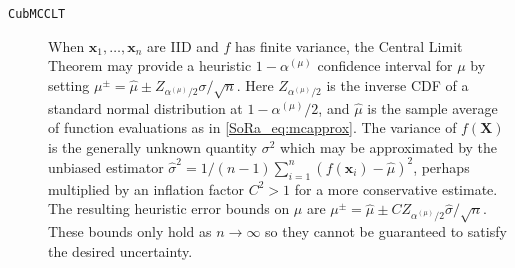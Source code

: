\documentclass[graybox]{svmult}
\begin{document}
\begin{description}
    \item[\texttt{CubMCCLT}] When $\boldsymbol{x}_1,\dots,\boldsymbol{x}_n$ are IID and $f$ has finite variance, the Central Limit Theorem may provide a heuristic $1-\alpha^{(\mu)}$ confidence interval for $\mu$ by setting $\mu^\pm = \hat{\mu} \pm Z_{\alpha^{(\mu)}/2}\sigma/\sqrt{n}$. Here $Z_{\alpha^{(\mu)}/2}$ is the inverse CDF of a standard normal distribution at $1-\alpha^{(\mu)}/2$, and $\hat{\mu}$ is the sample average of function evaluations as in \eqref{SoRa_eq:mcapprox}. The variance of $f(\boldsymbol{X})$ is the generally unknown quantity $\sigma^2$ which may be approximated by the unbiased estimator $\hat{\sigma}^2 = 1/(n-1)\sum_{i=1}^n (f(\boldsymbol{x}_i)-\hat{\mu})^2$, perhaps multiplied by an inflation factor $C^2>1$ for a more conservative estimate. The resulting  heuristic error bounds on $\mu$ are $\mu^\pm = \hat{\mu} \pm CZ_{\alpha^{(\mu)}/2} \hat{\sigma} / \sqrt{n}$. These bounds only hold as $n \to \infty$ so they cannot be guaranteed to satisfy the desired uncertainty.
    

\end{description}
\end{document}
